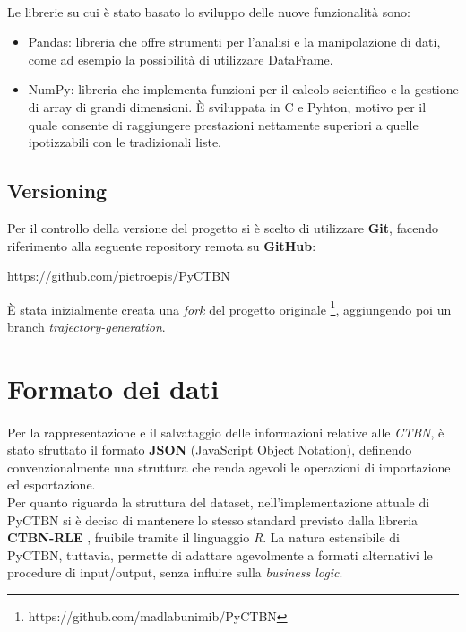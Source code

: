   \paragraph{}
  Le librerie su cui è stato basato lo sviluppo delle nuove funzionalità sono:
  \begin{itemize}
    \item Pandas: libreria che offre strumenti per l'analisi e la manipolazione di dati,
      come ad esempio la possibilità di utilizzare DataFrame. \cite{pandas}
    \item NumPy: libreria che implementa funzioni per il calcolo scientifico e la
      gestione di array di grandi dimensioni. È sviluppata in C e Pyhton, motivo per
      il quale consente di raggiungere prestazioni nettamente superiori a quelle 
      ipotizzabili con le tradizionali liste. \cite{numpy}
  \end{itemize}

  \subsection{Versioning}
  Per il controllo della versione del progetto si è scelto di utilizzare \textbf{Git},
  facendo riferimento alla seguente repository remota su \textbf{GitHub}:
  \begin{center}
    https://github.com/pietroepis/PyCTBN
  \end{center}
  
  È stata inizialmente creata una \textit{fork} del progetto originale \footnote{https://github.com/madlabunimib/PyCTBN}, aggiungendo poi
  un branch \textit{trajectory-generation}.

  \section{Formato dei dati}
  \paragraph{}
  Per la rappresentazione e il salvataggio delle informazioni relative alle \textit{CTBN},
  è stato sfruttato il formato \textbf{JSON} (JavaScript Object Notation), definendo convenzionalmente una struttura
  che renda agevoli le operazioni di importazione ed esportazione.\\
  Per quanto riguarda la struttura del dataset, nell'implementazione attuale di PyCTBN 
  si è deciso di mantenere lo stesso standard previsto dalla libreria \textbf{CTBN-RLE} \cite{package},
  fruibile tramite il linguaggio \textit{R}. La natura estensibile di PyCTBN, tuttavia,
  permette di adattare agevolmente a formati alternativi le procedure di input/output,
  senza influire sulla \textit{business logic}.

